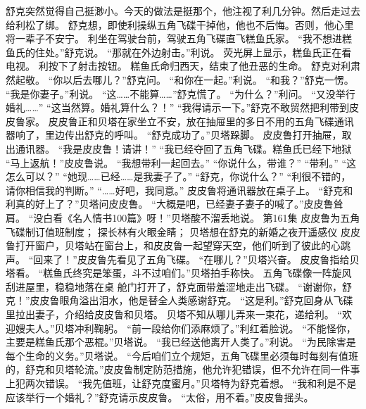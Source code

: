 \documentclass[a4paper,12pt,UTF8,twoside]{ctexbook}
\begin{document}
        舒克突然觉得自己挺渺小。今天的做法是挺那个，他注视了利几分钟。然后走过去给利松了绑。 
        舒克想，即使利操纵五角飞碟干掉他，他也不后悔。否则，他心里将一辈子不安宁。 
        利坐在驾驶台前，驾驶五角飞碟直飞糕鱼氏家。 
        “我不想进糕鱼氏的住处。”舒克说。 
        “那就在外边射击。”利说。 
        荧光屏上显示，糕鱼氏正在看电视。 
        利按下了射击按钮。 
        糕鱼氏命归西天，结束了他丑恶的生命。 
        舒克对利肃然起敬。 
        “你以后去哪儿？”舒克问。 
        “和你在一起。”利说。 
        “和我？”舒克一愣。 
        “我是你妻子。”利说。 
        “这……不能算……”舒克慌了。 
        “为什么？”利问。 
        “又没举行婚礼……” 
        “这当然算。婚礼算什么？！” 
        “我得请示一下。”舒克不敢贸然把利带到皮皮鲁家。 
        皮皮鲁正和贝塔在家坐立不安，放在抽屉里的多日不用的五角飞碟通讯器响了，里边传出舒克的呼叫。 
        “舒克成功了。”贝塔跺脚。 
        皮皮鲁打开抽屉，取出通讯器。 
        “我是皮皮鲁！请讲！” 
        “我已经夺回了五角飞碟。糕鱼氏已经下地狱 
        “马上返航！”皮皮鲁说。 
        “我想带利一起回去。” 
        “你说什么，带谁？” 
        “带利。” 
        “这怎么可以？” 
        “她现……已经……是我妻子了。” 
        “舒克，你说什么？” 
        “利很不错的，请你相信我的判断。” 
        “……好吧，我同意。” 
        皮皮鲁将通讯器放在桌子上。 
        “舒克和利真的好上了？”贝塔问皮皮鲁。 
      “大概是吧，已经妻子妻子的喊了。”皮皮鲁耸肩。 
        “没白看《名人情书100篇》呀！”贝塔酸不溜丢地说。   第161集 
        皮皮鲁为五角飞碟制订值班制度； 
        探长林有火眼金睛； 
        贝塔想在舒克的新婚之夜开遥感仪   
        皮皮鲁打开窗户，贝塔站在窗台上，和皮皮鲁一起望穿天空，他们听到了彼此的心跳声。 
        “回来了！”皮皮鲁先看见了五角飞碟。 
        “在哪儿？”贝塔兴奋。 
        皮皮鲁指给贝塔看。 
        “糕鱼氏终究是笨蛋，斗不过咱们。”贝塔拍手称快。 
        五角飞碟像一阵旋风刮进屋里，稳稳地落在桌 
        舱门打开了，舒克面带羞涩地走出飞碟。 
        “谢谢你，舒克！”皮皮鲁眼角溢出泪水，他是替全人类感谢舒克。 
        “这是利。”舒克回身从飞碟里拉出妻子，介绍给皮皮鲁和贝塔。 
        贝塔不知从哪儿弄来一束花，递给利。 
        “欢迎嫂夫人。”贝塔冲利鞠躬。 
        “前一段给你们添麻烦了。”利红着脸说。 
        “不能怪你，主要是糕鱼氏那个恶棍。”贝塔说。 
        “我已经送他离开人类了。”利说。 
        “为民除害是每个生命的义务。”贝塔说。 
        “今后咱们立个规矩，五角飞碟里必须每时每刻有值班的，舒克和贝塔轮流。”皮皮鲁制定防范措施，他允许犯错误，但不允许在同一件事上犯两次错误。 
        “我先值班，让舒克度蜜月。”贝塔特为舒克着想。 
        “我和利是不是应该举行一个婚礼？”舒克请示皮皮鲁。 
        “太俗，用不着。”皮皮鲁摇头。 
\end{document}
